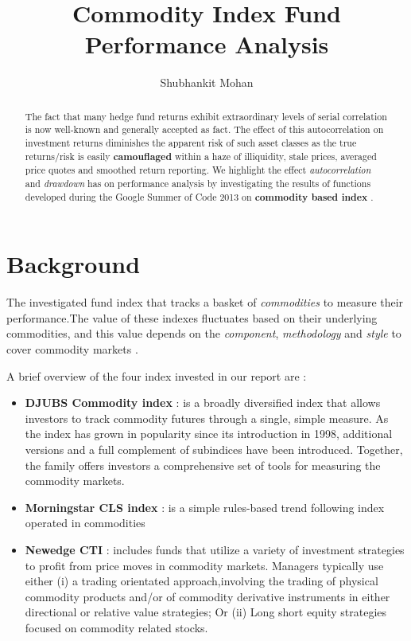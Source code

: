 \documentclass[12pt,letterpaper,english]{article}
\title{Commodity Index Fund Performance Analysis}
\author{Shubhankit Mohan}
\begin{document}


\maketitle


\begin{abstract}
The fact that many hedge fund returns exhibit extraordinary levels of serial correlation is now well-known and generally accepted as fact. The effect of this autocorrelation on investment returns diminishes the apparent risk of such asset classes as the true returns/risk is easily \textbf{camouflaged} within a haze of illiquidity, stale prices, averaged price quotes and smoothed return reporting. We highlight the effect \emph{autocorrelation} and \emph{drawdown} has on performance analysis by investigating the results of functions developed during the Google Summer of Code 2013 on \textbf{commodity based index} .
\end{abstract}

\tableofcontents



\section{Background}
The investigated fund index that tracks a basket of \emph{commodities} to measure their performance.The value of these indexes fluctuates based on their underlying commodities, and this value depends on the \emph{component}, \emph{methodology} and \emph{style} to cover commodity markets .

A brief overview of the four index invested in our report are : 
  \begin{itemize}
    \item
     \textbf{DJUBS Commodity index} :  is a broadly diversified index that allows investors to track commodity futures through a single, simple measure. As the index has grown in popularity since its introduction in 1998, additional versions and a full complement of subindices have been introduced. Together, the family offers investors a comprehensive set of tools for measuring the commodity markets.
      \item
 \textbf{Morningstar CLS index} : is a simple rules-based trend following index operated in commodities
   \item
    \textbf{Newedge CTI} :  includes funds that utilize a variety of investment strategies to profit from price moves in commodity markets.
Managers typically use either (i) a trading orientated approach,involving the trading of physical commodity products and/or of commodity
derivative instruments in either directional or relative value strategies; Or (ii) Long short equity strategies focused on commodity related stocks.
  \end{itemize}
  
\end{document}
